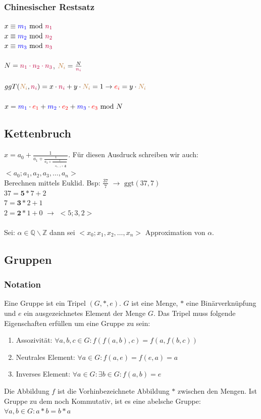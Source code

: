 \documentclass[10pt]{article}
\newcommand{\T}[1]{\text{#1}} %
\begin{document}
\subsubsection{Chinesischer Restsatz}
 $x\equiv {\color{blue}m_1}\T{ mod }{\color{purple}n_1}$ \\
 $x\equiv {\color{blue}m_2}\T{ mod }{\color{purple}n_2}$\\
 $x\equiv {\color{blue}m_3}\T{ mod }{\color{purple}n_3}$\\
\\
$N={\color{purple}n_1\cdot n_2 \cdot n_3}$, 
${\color{brown}N_i}=\frac{N}{\color{purple}n_i}$\\
\\
$ggT({\color{brown}N_i},{\color{purple}n_i})=x\cdot {\color{purple}n_i}+y\cdot {\color{brown}N_i} = 1 \to {\color{red}e_i}=y\cdot {\color{brown}N_i}$ \\
 \\
 $x={\color{blue}m_1}\cdot {\color{red}e_1}+{\color{blue}m_2}\cdot {\color{red}e_2}+{\color{blue}m_3}\cdot {\color{red}e_3}\T{ mod } N$ 
 
\subsection{Kettenbruch}
$x=a_0+\frac{1}{a_1+\frac{1}{a_2+\frac{1}{\quad\stackrel{\vdots}{a_{n-1}+\frac{1}{a_n}}}}}$. Für diesen Ausdruck schreiben wir auch: $<a_0;a_1,a_2,a_3,\ldots,a_n>$ \\
Berechnen mittels Euklid. Bsp: $\frac{37}{7}$ $\rightarrow$ $\text{ggt}(37, 7)$\\
$37 = \textbf{5}*7 + 2$\\
$7 = \textbf{3}*2 + 1$\\
$2 = \textbf{2}*1 + 0$ $\rightarrow$ $<5;3,2>$ \\
\\
Sei: $\alpha \in \mathbb{Q} \backslash \mathbb{Z}$ dann sei $<x_0; x_1, x_2, \ldots, x_n>$ Approximation von $\alpha$.

\subsection{Gruppen}
\subsubsection{Notation}
Eine Gruppe ist ein Tripel $(G, *, e)$. $G$ ist eine Menge, $*$ eine Binärverknüpfung und $e$ ein ausgezeichnetes Element der Menge $G$. Das Tripel muss folgende Eigenschaften erfüllen um eine Gruppe zu sein:
\begin{enumerate}
	\item Assozivität: $\forall a,b,c \in G : f(f(a,b),c) = f(a,f(b,c))$
	\item Neutrales Element: $\forall a \in G : f(a,e) = f(e,a) = a$
	\item Inverses Element: $\forall a \in G:\exists b \in G:f(a,b)=e$
\end{enumerate}
Die Abbildung $f$ ist die Vorhinbezeichnete Abbildung $*$ zwischen den Mengen. Ist Gruppe zu dem noch Kommutativ, ist es eine abelsche Gruppe: $\forall a, b \in G : a * b = b * a$
\end{document}
